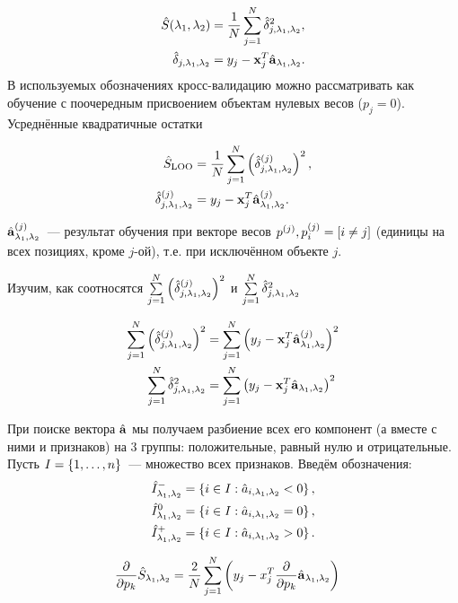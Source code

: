 
\def\lams{{\lambda_1,\lambda_2}}

\begin{align}
	\hat S(\lams) &= \frac1N\sum_{j=1}^N \hat\delta_{j, \lams}^2, \\
	\hat \delta_{j, \lams} &= y_j - \mb x_j^T \hat {\mb a}_{\lams}.
\end{align}
В используемых обозначениях кросс-валидацию можно рассматривать как обучение с поочередным присвоением объектам нулевых весов ($p_j=0$).
Усреднённые квадратичные остатки 


\begin{align}
	\hat{S}_{\text{LOO}}&=\frac1N\sum_{j=1}^N\sqr{\hat{\delta}_{j, \lams}^{(j)}}, \\
	\hat \delta_{j, \lams}^{(j)} &= y_j - \mb x_j^T \hat {\mb a}_{\lams}^{(j)}.
\end{align}

$\hat {\mb a}_{\lams}^{(j)}$~--- результат обучения при векторе весов $p^{(j)}, p_i^{(j)} = \left[i \ne j\right]$ (единицы на всех позициях, кроме $j$-ой), т.е. при исключённом объекте $j.$


Изучим, как соотносятся 
$\suml_{j=1}^N\sqr{\hat{\delta}_{j, \lams}^{(j)}}$
и $\suml_{j=1}^N \hat\delta_{j, \lams}^2$

\begin{align}
	\suml_{j=1}^N\sqr{\hat{\delta}_{j, \lams}^{(j)}} &= 
		\suml_{j=1}^N\sqr{y_j - \mb x_j^T \hat {\mb a}_{\lams}^{(j)}} \\
	\suml_{j=1}^N \hat\delta_{j, \lams}^2 &= 
		\suml_{j=1}^N \sqr{y_j - \mb x_j^T \hat {\mb a}_{\lams}}
\end{align}

При поиске вектора $\hat{\boldsymbol{\mathbf{a}}}$ мы получаем разбиение всех его компонент (а вместе с ними и признаков) на 3 группы: положительные, равный нулю и отрицательные. Пусть $I=\left\{1,\ldots, n\right\}$~--- множество всех признаков. Введём  обозначения:
\begin{align}
	\hat I^-_\lams &= \fbr{i\in I: \hat a_{i, \lams} < 0}, \\
	\hat I^0_\lams &= \fbr{i\in I: \hat a_{i, \lams} = 0}, \\
	\hat I^+_\lams &= \fbr{i\in I: \hat a_{i, \lams} > 0}.
\end{align}

\begin{align}
	\dd{}{p_k}\hat{S}_{\lams}&= \frac2N\sum_{j=1}^N\cbr{y_j - x_j^T \dd{}{p_k}\hat {\mb a}_{\lams}}
\end{align}
